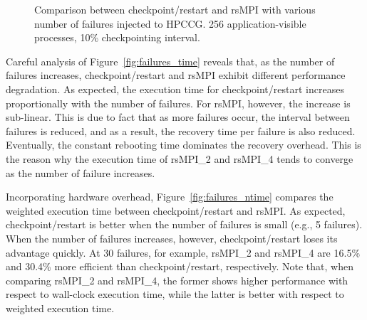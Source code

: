 \begin{figure}[!t]
  \begin{center}
  \end{center}
  \caption{Comparison between checkpoint/restart and rsMPI with various number of failures injected to HPCCG. 256 application-visible processes, 10\% checkpointing interval.}
  \label{fig:multiple_failure}
\end{figure}


Careful analysis of Figure~\ref{fig:failures_time} reveals that, as the number of failures increases, checkpoint/restart and rsMPI exhibit different performance degradation. As expected, the execution time for checkpoint/restart increases proportionally with the number of failures. For rsMPI, however, the increase is sub-linear. This is due to fact that as more failures occur, the interval between failures is reduced, and as a result, the recovery time per failure is also reduced. 
Eventually, the constant rebooting time dominates the recovery overhead. This is the reason why the execution time of rsMPI\_2 and rsMPI\_4 tends to converge as the number of failure increases. 

Incorporating hardware overhead, Figure~\ref{fig:failures_ntime} compares the weighted execution time between checkpoint/restart and rsMPI.  As expected, checkpoint/restart is better when the number of  failures is small (e.g., 5 failures).  When the number of failures increases,  however, checkpoint/restart loses its advantage quickly. At 30 failures, for example, rsMPI\_2 and rsMPI\_4 are 16.5\% and 30.4\% more efficient than checkpoint/restart, respectively.
Note that, when comparing rsMPI\_2 and rsMPI\_4, the former shows higher performance with respect to wall-clock execution time, while the latter is better with respect to weighted execution time. 


